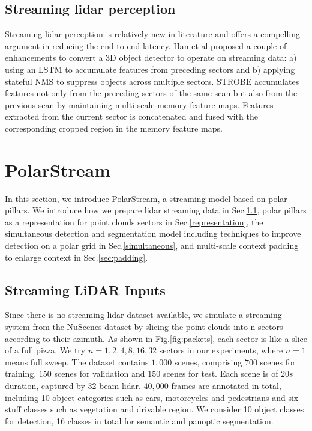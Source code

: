 \documentclass{article}
\begin{document}
\vspace{-3mm}\subsection{Streaming lidar perception}\vspace{-2mm}

Streaming lidar perception is relatively new in literature and offers a compelling argument in reducing the end-to-end latency. Han et al \cite{han2020streaming} proposed a couple of enhancements to convert a 3D object detector to operate on streaming data: a) using an LSTM to accumulate features from preceding sectors and b) applying stateful NMS to suppress objects across multiple sectors. STROBE \cite{frossard2020strobe} accumulates features not only from the preceding sectors of the same scan but also from the previous scan by maintaining multi-scale memory feature maps. Features extracted from the current sector is concatenated and fused with the corresponding cropped region in the memory feature maps.

\vspace{-3mm}\section{PolarStream}
\label{methods}\vspace{-3mm}

In this section, we introduce PolarStream, a streaming model based on polar pillars. We introduce how we prepare lidar streaming data in Sec.\ref{input}, polar pillars as a representation for point clouds sectors in Sec.\ref{representation}, the simultaneous detection and segmentation model including techniques to improve detection on a polar grid in Sec.\ref{simultaneous}, and multi-scale context padding to enlarge context in Sec.\ref{sec:padding}. 

\vspace{-4mm}\subsection{Streaming LiDAR Inputs}\label{input}\vspace{-2mm}
Since there is no streaming lidar dataset available, we simulate a streaming system from the NuScenes dataset \cite{caesar2019nuscenes} by slicing the point clouds into n sectors according to their azimuth. As shown in Fig.\ref{fig:packets}, each sector is like a slice of a full pizza. We try $n = 1,2,4,8,16,32$ sectors in our experiments, where $n=1$ means full sweep.  The dataset contains $1,000$ scenes, comprising $700$ scenes for training, $150$ scenes for validation and $150$ scenes for test. Each scene is of $20s$ duration, captured by 32-beam lidar. $40, 000$ frames are annotated in total, including 10 object categories such as cars, motorcycles and pedestrians and six stuff classes such as vegetation and drivable region. We consider 10 object classes for detection, 16 classes in total for semantic and panoptic segmentation.
\end{document}
